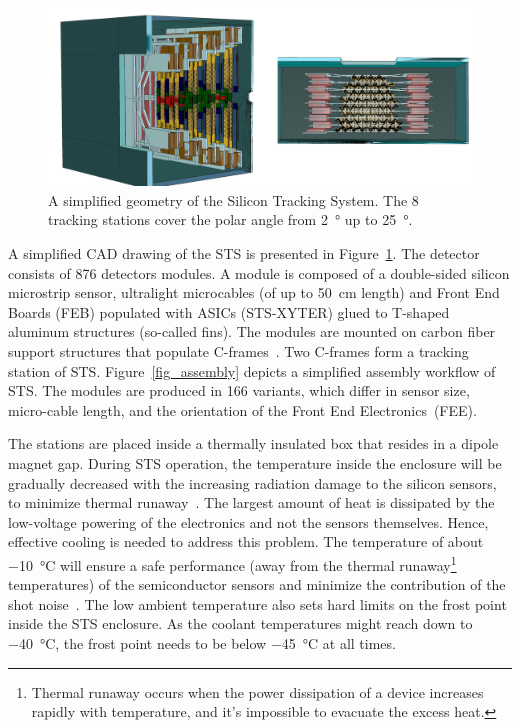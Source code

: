 \begin{figure}[!h]
\centering
\includegraphics[width=0.85\columnwidth]{Chapter2/images/STS.png}
\caption{A simplified geometry of the Silicon Tracking System. The 8 tracking stations cover the polar angle from \SI{2}{\degree} up to \SI{25}{\degree}.}
\label{fig_STS}
\end{figure}
A simplified CAD drawing of the \gls{STS} is presented in Figure~\ref{fig_STS}. The detector consists of 876 detectors modules. A module is composed of a double-sided silicon microstrip sensor, ultralight microcables (of up to \SI{50}{\centi\metre} length) and Front End Boards (\gls{FEB}) populated with ASICs (STS-XYTER) glued to T-shaped aluminum structures (so-called fins). The modules are mounted on carbon fiber support structures that populate C-frames~\cite{progress_report_2016}. Two C-frames form a tracking station of \gls{STS}.  Figure~\ref{fig_assembly} depicts a simplified assembly workflow of \gls{STS}.
The modules are produced in 166 variants, which differ in sensor size, micro-cable length, and the orientation of the Front End Electronics~(\gls{FEE}).  


The stations are placed inside a thermally insulated box that resides in a dipole magnet gap. During \gls{STS} operation, the temperature inside the enclosure will be gradually decreased with the increasing radiation damage to the silicon sensors, to minimize thermal runaway~\cite{Spieler}. The largest amount of heat is dissipated by the low-voltage powering of the electronics and not the sensors themselves. Hence, effective cooling is needed to address this problem.
The temperature of about \SI{-10}{\celsius} will ensure a safe performance (away from the thermal runaway\footnote{Thermal runaway occurs when the power dissipation of a device increases rapidly with temperature, and it's impossible to evacuate the excess heat.} temperatures) of the semiconductor sensors and minimize the contribution of the shot noise~\cite{Spieler}. The low ambient temperature also sets hard limits on the frost point inside the STS enclosure. As the coolant temperatures might reach down to \SI{-40}{\celsius}, the frost point needs to be below \SI{-45}{\celsius} at all times. 

